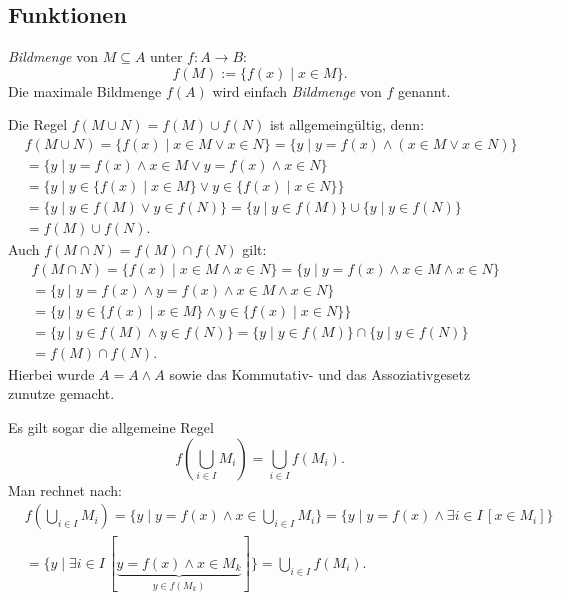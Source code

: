 \documentclass[a4paper,11pt,fleqn,twoside]{scrartcl}
\numberwithin{equation}{section}
\newcommand{\strong}[1]{{\sf\bfseries #1}}
\newenvironment{Definition}{\strong{Definition.}}{\par}
\begin{document}
\subsection{Funktionen}
\begin{Definition}
\emph{Bildmenge} von $M\subseteq A$ unter $f\colon A\to B$:
\begin{equation}
f(M) := \{f(x)\mid x\in M\}.
\end{equation}
Die maximale Bildmenge $f(A)$ wird einfach \emph{Bildmenge} von $f$ genannt.
\end{Definition}
Die Regel $f(M\cup N)=f(M)\cup f(N)$ ist allgemeingültig, denn:
\begin{align}
&f(M\cup N) = \{f(x)\mid x\in M\lor x\in N\}
= \{y\mid y=f(x)\land(x\in M\lor x\in N)\}\\
&= \{y\mid y=f(x)\land x\in M\lor y=f(x)\land x\in N\}\\
&= \{y\mid y\in\{f(x)\mid x\in M\}\lor y\in\{f(x)\mid x\in N\}\}\\
&= \{y\mid y\in f(M)\lor y\in f(N)\}
= \{y\mid y\in f(M)\}\cup \{y\mid y\in f(N)\}\\
&= f(M)\cup f(N).
\end{align}
Auch $f(M\cap N)=f(M)\cap f(N)$ gilt:
\begin{align}
&f(M\cap N) = \{f(x)\mid x\in M\land x\in N\}
= \{y\mid y=f(x)\land x\in M\land x\in N\}\\
&= \{y\mid y=f(x)\land y=f(x)\land x\in M\land x\in N\}\\
&= \{y\mid y\in\{f(x)\mid x\in M\}\land y\in\{f(x)\mid x\in N\}\}\\
&= \{y\mid y\in f(M)\land y\in f(N)\}
= \{y\mid y\in f(M)\}\cap \{y\mid y\in f(N)\}\\
&= f(M)\cap f(N).
\end{align}
Hierbei wurde $A=A\land A$ sowie das Kommutativ- und das
Assoziativgesetz zunutze gemacht.

Es gilt sogar die allgemeine Regel
\begin{equation}
f(\bigcup_{i\in I} M_i) = \bigcup_{i\in I} f(M_i).
\end{equation}
Man rechnet nach:
\begin{align}
&f(\bigcup_{i\in I} M_i)
= \{y\mid y=f(x)\land x\in\bigcup_{i\in I} M_i\}
= \{y\mid y=f(x)\land\exists i{\in}I\,[x\in M_i]\}\\
&= \{y\mid\exists i{\in}I\,[\underbrace{y=f(x)\land x\in M_k}_{y\in f(M_k)}]\}
= \bigcup_{i\in I} f(M_i).
\end{align}
\end{document}
